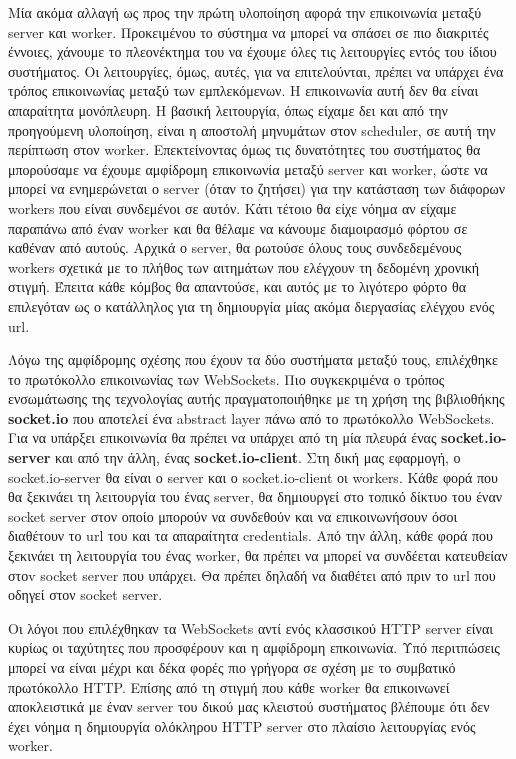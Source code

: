 Μία ακόμα αλλαγή ως προς την πρώτη υλοποίηση αφορά την επικοινωνία μεταξύ server και worker. Προκειμένου το σύστημα να
μπορεί να σπάσει σε πιο διακριτές έννοιες, χάνουμε το πλεονέκτημα του να έχουμε όλες τις λειτουργίες εντός του ίδιου συστήματος.
Οι λειτουργίες, όμως, αυτές, για να επιτελούνται, πρέπει να υπάρχει ένα τρόπος επικοινωνίας μεταξύ των εμπλεκόμενων.
Η επικοινωνία αυτή δεν θα είναι απαραίτητα μονόπλευρη. Η βασική λειτουργία, όπως είχαμε δει και από την προηγούμενη υλοποίηση,
είναι η αποστολή μηνυμάτων στον scheduler, σε αυτή την περίπτωση στον worker. Επεκτείνοντας όμως τις δυνατότητες του συστήματος
θα μπορούσαμε να έχουμε αμφίδρομη επικοινωνία μεταξύ server και worker, ώστε να μπορεί να ενημερώνεται ο server (όταν το ζητήσει) για την
κατάσταση των διάφορων workers που είναι συνδεμένοι σε αυτόν. Κάτι τέτοιο θα είχε νόημα αν είχαμε παραπάνω από έναν worker και θα θέλαμε να κάνουμε
διαμοιρασμό φόρτου σε καθέναν από αυτούς. Αρχικά ο server, θα ρωτούσε όλους τους συνδεδεμένους workers σχετικά με το πλήθος των αιτημάτων
που ελέγχουν τη δεδομένη χρονική στιγμή. Έπειτα κάθε κόμβος θα απαντούσε, και αυτός με το λιγότερο φόρτο θα επιλεγόταν ως ο κατάλληλος
για τη δημιουργία μίας ακόμα διεργασίας ελέγχου ενός url.

Λόγω της αμφίδρομης σχέσης που έχουν τα δύο συστήματα μεταξύ τους, επιλέχθηκε το πρωτόκολλο επικοινωνίας των WebSockets.
Πιο συγκεκριμένα ο τρόπος ενσωμάτωσης της τεχνολογίας αυτής πραγματοποιήθηκε με τη χρήση της βιβλιοθήκης \textbf{socket.io} που αποτελεί ένα
abstract layer πάνω από το πρωτόκολλο WebSockets. Για να υπάρξει επικοινωνία θα πρέπει να υπάρχει από τη μία πλευρά ένας \textbf{socket.io-server} και από την άλλη, ένας \textbf{socket.io-client}.
Στη δική μας εφαρμογή, ο socket.io-server θα είναι ο server και ο socket.io-client οι workers. Κάθε φορά που θα ξεκινάει τη λειτουργία του ένας server, θα δημιουργεί στο τοπικό δίκτυο του
έναν socket server στον οποίο μπορούν να συνδεθούν και να επικοινωνήσουν όσοι διαθέτουν το url του και τα απαραίτητα credentials. Από την άλλη,
κάθε φορά που ξεκινάει τη λειτουργία του ένας worker, θα πρέπει να μπορεί να συνδέεται κατευθείαν στοv socket server που υπάρχει.
Θα πρέπει δηλαδή να διαθέτει από πριν το url που οδηγεί στον socket server.

Οι λόγοι που επιλέχθηκαν τα WebSockets αντί ενός κλασσικού HTTP server είναι κυρίως οι ταχύτητες που προσφέρουν και η αμφίδρομη επκοινωνία. Υπό περιτπώσεις
μπορεί να είναι μέχρι και δέκα φορές πιο γρήγορα σε σχέση με το συμβατικό πρωτόκολλο HTTP. Επίσης από τη στιγμή που κάθε worker
θα επικοινωνεί αποκλειστικά με έναν server του δικού μας κλειστού συστήματος βλέπουμε ότι δεν έχει νόημα η δημιουργία ολόκληρου HTTP server στο πλαίσιο λειτουργίας ενός worker.

